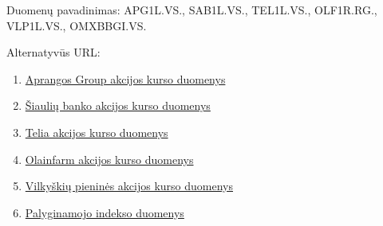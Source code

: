 \documentclass[12pt]{article}
\begin{document}
Duomenų pavadinimas: APG1L.VS., SAB1L.VS., TEL1L.VS., OLF1R.RG., VLP1L.VS., OMXBBGI.VS.

Alternatyvūs URL:
\begin{enumerate}
\item \href{https://finance.yahoo.com/quote/APG1L.VS?p=APG1L.VS&.tsrc=fin-srch}{Aprangos Group akcijos kurso duomenys}

\item\href{https://finance.yahoo.com/quote/SAB1L.VS?p=SAB1L.VS&.tsrc=fin-srch}{Šiaulių banko akcijos kurso duomenys}

\item\href{https://finance.yahoo.com/quote/TEL1L.VS?p=TEL1L.VS&.tsrc=fin-srch}{Telia akcijos kurso duomenys}

\item\href{https://finance.yahoo.com/quote/OLF1R.RG?p=OLF1R.RG&.tsrc=fin-srch}{Olainfarm akcijos kurso duomenys}

\item\href{https://finance.yahoo.com/quote/VLP1L.VS?p=VLP1L.VS}{Vilkyškių pieninės akcijos kurso duomenys}

\item\href{https://finance.yahoo.com/quote/\%5EOMXBBGI/}{Palyginamojo indekso duomenys}
\end{enumerate}
\end{document}
